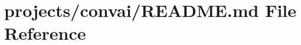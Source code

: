 \hypertarget{projects_2convai_2README_8md}{}\section{projects/convai/\+R\+E\+A\+D\+ME.md File Reference}
\label{projects_2convai_2README_8md}
